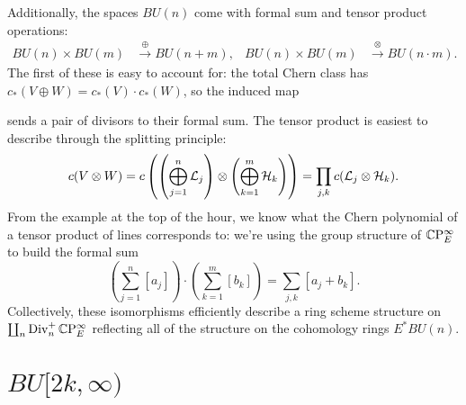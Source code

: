 Additionally, the spaces $BU(n)$ come with formal sum and tensor product operations:
\begin{align*}
BU(n) \times BU(m) & \xrightarrow{\oplus} BU(n+m), & BU(n) \times BU(m) & \xrightarrow{\otimes} BU(n \cdot m).
\end{align*}
The first of these is easy to account for: the total Chern class has $c_*(V \oplus W) = c_*(V) \cdot c_*(W)$, so the induced map
\begin{center}
\end{center}
sends a pair of divisors to their formal sum.  The tensor product is easiest to describe through the splitting principle:
\[
c(V \otimes W) = c\left( \left( \bigoplus_{j=1}^n \mathcal{L}_j\right) \otimes \left( \bigoplus_{k=1}^m \mathcal{H}_k \right)\right) = \prod_{j, k} c(\mathcal{L}_j \otimes \mathcal{H}_k).
\]
From the example at the top of the hour, we know what the Chern polynomial of a tensor product of lines corresponds to: we're using the group structure of $\mathbb{C}\mathrm P^\infty_E$ to build the formal sum \[\left( \sum_{j=1}^n [a_j] \right) \cdot \left( \sum_{k=1}^m [b_k]\right) = \sum_{j,k} [a_j + b_k].\]  Collectively, these isomorphisms efficiently describe a ring scheme structure on $\coprod_n \operatorname{Div}_n^+ \mathbb{C}\mathrm P^\infty_E$ reflecting all of the structure on the cohomology rings $E^* BU(n)$.



\section*{$BU[2k, \infty)$}

